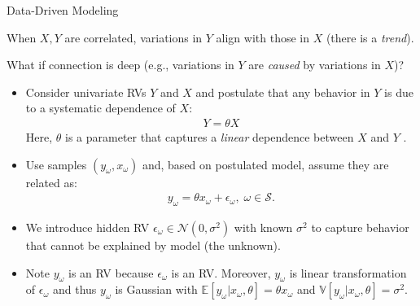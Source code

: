 \documentclass[handout,9pt]{beamer}
\begin{document}
%
\begin{frame}{Data-Driven Modeling}

When $X,Y$ are correlated, variations in $Y$ align with those in $X$ (there is a {\em trend}). 
\begin{block}{}
What if connection is deep (e.g., variations in $Y$ are {\em caused} by variations in $X$)? 
\end{block}

\begin{itemize}
\setlength{\itemsep}{10pt}
\item Consider univariate RVs $Y$ and $X$ and postulate that any behavior in $Y$ is due to a systematic dependence of $X$:
\begin{align*}
Y=\theta X
\end{align*}
Here, $\theta$ is a parameter that captures a {\em linear} dependence between $X$ and $Y$ . 

\item Use samples $(y_\omega,x_\omega)$ and, based on postulated model, assume they are related as:
\begin{align*}
y_\omega=\theta x_\omega + \epsilon_\omega,\; \omega \in \mathcal{S}.
\end{align*}
\item We introduce hidden RV $\epsilon_\omega\in \mathcal{N}(0,\sigma^2)$ with known $\sigma^2$ to capture behavior that cannot be explained by model (the unknown).  

\item  Note $y_\omega$ is an RV because $\epsilon_\omega$ is an RV. Moreover, $y_\omega$ is linear transformation of $\epsilon_\omega$ and thus $y_\omega$ is Gaussian with $\mathbb{E}[y_\omega|x_\omega,\theta]=\theta x_\omega$ and  $\mathbb{V}[y_\omega|x_\omega,\theta]=\sigma^2$. 

\end{itemize}

\end{frame}
\end{document}
